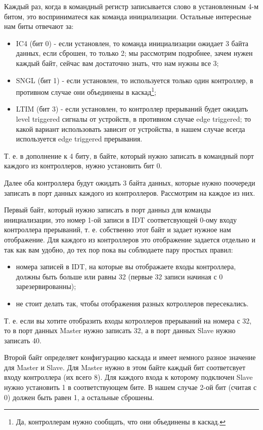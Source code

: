 Каждый раз, когда в командный регистр записывается слово в установленным 4-м
битом, это восприниматеся как команда инициализации. Остальные интересные нам
биты отвечают за:

\begin{itemize}
  \item IC4 (бит 0) - если установлен, то команда инициализации ожидает 3 байта
  данных, если сброшен, то только 2; мы рассмотрим подробнее, зачем нужен каждый
  байт, сейчас вам достаточно знать, что нам нужны все 3;
  \item SNGL (бит 1) - если установлен, то используется только один контроллер,
  в противном случае они объединены в каскад\footnote{Да, контроллерам нужно
  сообщать, что они объединены в каскад.};
  \item LTIM (бит 3) - если установлен, то контроллер прерываний будет ожидать
  level triggered сигналы от устройств, в противном случае edge triggered; то
  какой вариант использовать зависит от устройства, в нашем случае всегда
  используется edge triggered прерывания.
\end{itemize}

Т. е. в дополнение к 4 биту, в байте, который нужно записать в командный порт
каждого из контроллеров, нужно установить бит 0.

Далее оба контроллера будут ожидать 3 байта данных, которые нужно поочереди
записать в порт данных каждого из контроллеров. Рассмотрим на каждое из них.

Первый байт, который нужно записать в порт данныз для команды инициализации,
это номер 1-ой записи в IDT соответсвующей 0-ому входу контроллера прерываний,
т. е. собственно этот байт и задает нужное нам отображение. Для каждого из
контроллеров это отображение задается отдельно и так как вам удобно, до тех
пор пока вы соблюдаете пару простых правил:
\begin{itemize}
  \item номера записей в IDT, на которые вы отображаете входы контроллера,
  должны быть больше или равны 32 (первые 32 записи начиная с 0
  зарезервированны);
  \item не стоит делать так, чтобы отображения разных котроллеров пересекались.
\end{itemize}

Т. е. если вы хотите отобразить входы котроллеров прерываний на номера с 32, то
в порт данных Master нужно записать 32, а в порт данных Slave нужно записать 40.

Второй байт определяет конфигурацию каскада и имеет немного разное значение для
Master и Slave. Для Master нужно в этом байте каждый бит соответсвует входу
контроллера (их всего 8). Для каждого входа к которому подключен Slave нужно
установить 1 в соответствующем бите. В нашем случае 2-ой бит (считая с 0) должен
быть равен 1, а остальные сброшены.

